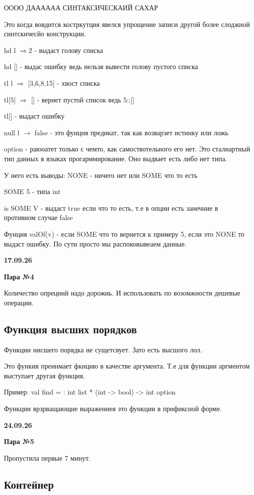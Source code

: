 \documentclass{article}
\begin{document}
ОООО ДАААААА СИНТАКСИЧЕСКАИЙ САХАР

Это когда вовдится костркутция явелся упрощение записи другой более слоджной 
синтскичесйо конструкции.

hd l $\Rightarrow 2$ - выдаст голову списка 

hd [] - выдас ошибку ведь нельзя вывести голову пустого списка 

tl l $\Rightarrow$ [3,6,8,15] - хвост списка 

tl[5] $\Rightarrow$ [] - вернет пустой список ведь 5::[]

tl[] - выдаст ошибку 

null l $\rightarrow$ false - это фунция предикат, так как возварзет истинку или ложь

option - раюоатет только с чемто, как самостяотельного его нет. Это сталнартный тип 
данных в языках прогарммирование. Оно выдвает есть либо нет типа. 

У него есть выводы: NONE - ничего нет или SOME что то есть 

SOME 5 - типа int 

is SOME V - выдаст true если что то есть, т.е в опции есть занечние в противном случае 
false 

Фунция valOf(v) - если SOME что то вернется к примеру 5, если это NONE то выдаст ошибку. 
По сути просто мы распоковывеаем данные. 


\textbf{17.09.26}

\textbf{Пара №4}

Количество опрециий надо дорожиь. И использовать по возомжности дешевые операции. 

\subsection{Функция высших порядков}

Функции нисшего порядка не сущетсвует. Зато есть высшого лол. 

Это функия преинмает фкнцию в качестве аргумента. Т.е для функции аргментом 
выступает другая функция. 

Пример: val find = : int list * (int -> bool) -> int option

Функции врзрващающие выражениея это функции в прификсной форме. 


\textbf{24.09.26}

\textbf{Пара №5}

Пропустила первые 7 минут. 

\subsection{Контейнер}
\end{document}
